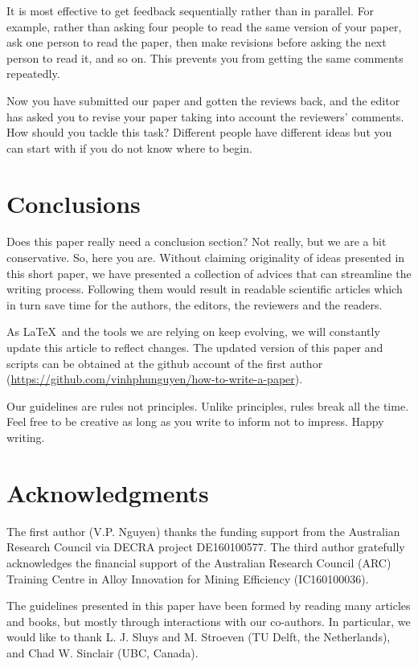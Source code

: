 \documentclass[authoryear,3p,times,preprint,review,fleqn]{elsarticle}
\numberwithin{equation}{section}
\theoremstyle{remark}
\begin{document}
It is most effective to get feedback sequentially rather than in parallel. For example, rather than asking four people to read the same version of your paper, ask one person to read the paper, then make revisions before asking the next person to read it, and so on. This prevents you from getting the same comments repeatedly.

Now you have submitted our paper and gotten the reviews back, and the editor has asked you to revise your paper taking into account the reviewers' comments. How should you tackle this task? Different people have different ideas but you can start with \cite{noble2017ten} if you do not know where to begin.

\section{Conclusions}

Does this paper really need a conclusion section? Not really, but we are a bit conservative. So, here you are. Without claiming  originality of ideas presented in this short paper, we have presented a collection of  advices that can streamline the writing process. Following them would result in readable scientific articles which in turn save time for the authors,  the editors, the reviewers and the readers.


As \LaTeX\ and the tools we are relying on keep evolving, we will constantly update this article to reflect changes. The updated version of this paper and scripts can be obtained at the github account of the first author (\url{https://github.com/vinhphunguyen/how-to-write-a-paper}).

Our guidelines are rules not principles. Unlike principles, rules break all the time. Feel free to be creative as long as you write to inform not to impress. Happy writing.

%
\section*{Acknowledgments}

 The first author (V.P. Nguyen) thanks the funding support from the Australian Research Council via DECRA project DE160100577.  The third  author gratefully acknowledges the financial support of the Australian Research Council (ARC) Training Centre in Alloy Innovation for Mining Efficiency (IC160100036).

 The guidelines presented in this paper have been formed by reading many articles and books, but mostly through interactions with our co-authors. In particular, we would like to thank L. J. Sluys and M. Stroeven (TU Delft, the Netherlands), and Chad W. Sinclair (UBC, Canada).
\end{document}
